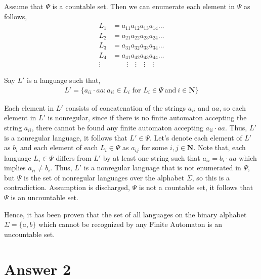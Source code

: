 \documentclass[12pt]{article}
\begin{document}
Assume that $\Psi$ is a countable set. Then we can enumerate each element in $\Psi$ as follows,
\begin{equation*}
    \begin{split}
        L_1 & = a_{11}a_{12}a_{13}a_{14} \ldots \\
        L_2 & = a_{21}a_{22}a_{23}a_{24} \ldots \\
        L_3 & = a_{31}a_{32}a_{33}a_{34} \ldots \\
        L_4 & = a_{41}a_{42}a_{43}a_{44} \ldots \\
        \vdots & \qquad \vdots \quad \vdots \quad \vdots \quad \vdots
    \end{split}
\end{equation*}

Say $L'$ is a language such that,
\begin{equation*}
    \begin{split}
        L' = \{a_{ii} \cdot aa: a_{ii} \in L_i \text{ for }L_i \in \Psi \ \text{and} \ i \in \mathbf{N}\}
    \end{split}
\end{equation*}

Each element in $L'$ consists of concatenation of the strings $a_{ii}$ and $aa$, so each element in $L'$ is nonregular, since if there is no finite automaton accepting the string $a_{ii}$, there cannot be found any finite automaton accepting $a_{ii} \cdot aa$. Thus, $L'$ is a nonregular language, it follows that $L' \in \Psi$. Let's denote each element of $L'$ as $b_i$ and each element of each $L_i \in \Psi$ as $a_{ij}$ for some $i, j \in \mathbf{N}$. Note that, each language $L_i \in \Psi$ differs from $L'$ by at least one string such that $a_{ii} = b_i \cdot aa$ which implies $a_{ii} \neq b_i$. Thus, $L'$ is a nonregular language that is not enumerated in $\Psi$, but $\Psi$ is the set of nonregular languages over the alphabet $\Sigma$, so this is a contradiction. Assumption is discharged, $\Psi$ is not a countable set, it follows that $\Psi$ is an uncountable set.

Hence, it has been proven that the set of all languages on the binary alphabet $\Sigma = \{a, b\}$ which cannot be recognized by any Finite Automaton is an uncountable set.

\section*{Answer 2}
\end{document}
